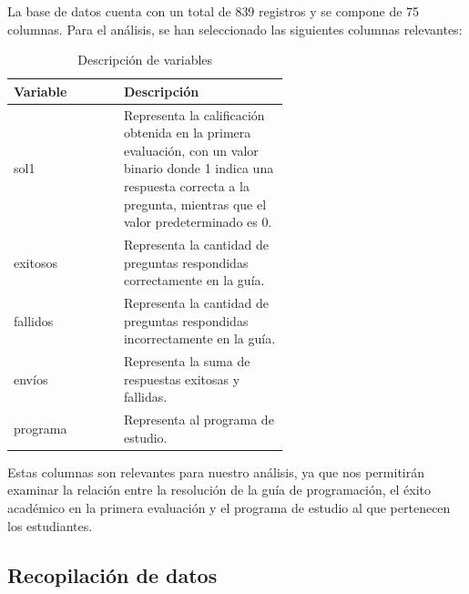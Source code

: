 La base de datos cuenta con un total de 839 registros y se compone de 75 columnas. Para el análisis,
se han seleccionado las siguientes columnas relevantes:

\begin{table}[htbp]
  \centering
  \caption{Descripción de variables}
  \begin{tabular}{|l|p{0.6\linewidth}|}
    \hline
    \textbf{Variable} & \textbf{Descripción}                                                                                                                                                               \\
    \hline
    sol1              & Representa la calificación obtenida en la primera evaluación, con un valor binario donde 1 indica una respuesta correcta a la pregunta, mientras que el valor predeterminado es 0. \\
    \hline
    exitosos          & Representa la cantidad de preguntas respondidas correctamente en la guía.                                                                                                          \\
    \hline
    fallidos          & Representa la cantidad de preguntas respondidas incorrectamente en la guía.                                                                                                        \\
    \hline
    envíos            & Representa la suma de respuestas exitosas y fallidas.                                                                                                                              \\
    \hline
    programa          & Representa al programa de estudio.                                                                                                                                                 \\
    \hline
  \end{tabular}
  \label{tab:variables}
\end{table}

Estas columnas son relevantes para nuestro análisis, ya que nos permitirán examinar la relación entre la resolución de la guía de programación,
el éxito académico en la primera evaluación y el programa de estudio al que pertenecen los estudiantes.


\subsection{Recopilación de datos}

